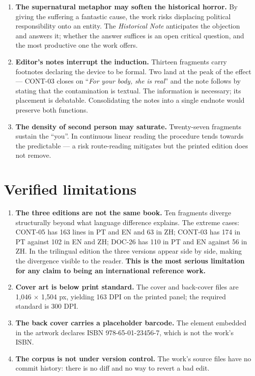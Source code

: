 \documentclass[11pt,a4paper]{article}
\begin{document}
\begin{enumerate}
\item \textbf{The supernatural metaphor may soften the historical horror.} By
giving the suffering a fantastic cause, the work risks displacing political
responsibility onto an entity. The \textit{Historical Note} anticipates the
objection and answers it; whether the answer suffices is an open critical
question, and the most productive one the work offers.

\item \textbf{Editor's notes interrupt the induction.} Thirteen fragments
carry footnotes declaring the device to be formal. Two land at the peak of the
effect --- CONT-03 closes on ``\textit{For your body, she is real}'' and the
note follows by stating that the contamination is textual. The information is
necessary; its placement is debatable. Consolidating the notes into a single
endnote would preserve both functions.

\item \textbf{The density of second person may saturate.} Twenty-seven
fragments sustain the ``you''. In continuous linear reading the procedure
tends towards the predictable --- a risk route-reading mitigates but the
printed edition does not remove.
\end{enumerate}

\section{Verified limitations}
\label{sec:limits}

\begin{enumerate}
\item \textbf{The three editions are not the same book.} Ten fragments diverge
structurally beyond what language difference explains. The extreme cases:
CONT-05 has 163 lines in PT and EN and 63 in ZH; CONT-03 has 174 in PT against
102 in EN and ZH; DOC-26 has 110 in PT and EN against 56 in ZH. In the
trilingual edition the three versions appear side by side, making the
divergence visible to the reader. \textbf{This is the most serious limitation
for any claim to being an international reference work.}

\item \textbf{Cover art is below print standard.} The cover and back-cover
files are 1,046 $\times$ 1,504 px, yielding 163 DPI on the printed panel; the
required standard is 300 DPI.

\item \textbf{The back cover carries a placeholder barcode.} The element
embedded in the artwork declares ISBN 978-65-01-23456-7, which is not the
work's ISBN.

\item \textbf{The corpus is not under version control.} The work's source
files have no commit history: there is no diff and no way to revert a bad edit.
\end{enumerate}
\end{document}
